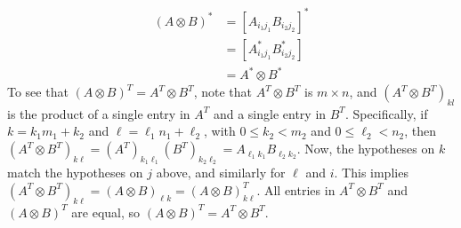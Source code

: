 \begin{align*}
(A\otimes B)^* &= \left[ A_{i_1j_1}B_{i_2j_2}\right]^* \tag{from above} \\
&= \left[ A_{i_1j_1}^*B_{i_2j_2}^*\right] \tag{piecewise conjugation} \\
&= A^*\otimes B^*\tag{consistent indexing}
\end{align*}
%
%
%
%
%
To see that $(A\otimes B)^T = A^T\otimes B^T$, note that $A^T\otimes B^T$ is $m\times n$, and $(A^T\otimes B^T)_{kl}$ is the product of a single entry in $A^T$ and a single entry in $B^T$.  Specifically, if $k = k_1m_1+k_2$ and $\ell=\ell_1n_1+\ell_2$, with $0\leq k_2 < m_2$ and $0\leq \ell_2 < n_2$, then $(A^T\otimes B^T)_{k\ell} = (A^T)_{k_1\ell_1}(B^T)_{k_2\ell_2} = A_{\ell_1k_1}B_{\ell_2k_2}$.  Now, the hypotheses on $k$ match the hypotheses on $j$ above, and similarly for $\ell$ and $i$.  This implies $(A^T\otimes B^T)_{k\ell} = (A\otimes B)_{\ell k} = (A\otimes B)^T_{k\ell}$.  All entries in $A^T\otimes B^T$ and $ (A\otimes B)^T$ are equal, so $(A\otimes B)^T = A^T\otimes B^T$.

